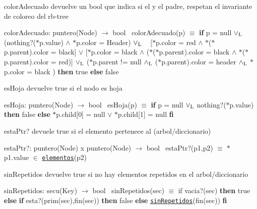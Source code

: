 \begin{DoxyParagraph}{color\+Adecuado}
devuelve un bool que indica si el y el padre, respetan el invariante de coloreo del rb-\/tree

color\+Adecuado\+: puntero(\+Node) $\to$ bool~\newline
 color\+Adecuado(p) $\equiv$ {\bfseries if} p = null $\lor_{\rm L}$ (nothing?($\ast$p.value) $\land$ $\ast$p.color = Header) $\lor_{\rm L}$ ~\newline
 \mbox{[}$\ast$p.color = red $\land$ $\ast$($\ast$p.parent).color = black\mbox{]} $\lor$ \mbox{[}$\ast$p.color = black $\land$ ($\ast$($\ast$p.parent).color = black $\land$ $\ast$($\ast$p.parent).color = red)\mbox{]} $\lor_{\rm L}$ ($\ast$p.parent != null $\land_{\rm L}$ ($\ast$p.parent).color = header $\land_{\rm L}$ $\ast$p.color = black ) {\bfseries then} true {\bfseries else} false 
\end{DoxyParagraph}


\begin{DoxyParagraph}{es\+Hoja}
devuelve true si el nodo es hoja

es\+Hoja\+: puntero(\+Node) $\to$ bool~\newline
 es\+Hoja(p) $\equiv$ {\bfseries if} p = null $\lor_{\rm L}$ nothing?($\ast$p.value) {\bfseries then} false {\bfseries else} $\ast$p.child\mbox{[}0\mbox{]} = null $\lor$ $\ast$p.child\mbox{[}1\mbox{]} = null {\bfseries fi} 
\end{DoxyParagraph}


\begin{DoxyParagraph}{esta\+Ptr?}
devuele true si el elemento pertenece al (arbol/diccionario)

esta\+Ptr?\+: puntero(\+Node) x puntero(\+Node) $\to$ bool~\newline
 esta\+Ptr?(p1,p2) $\equiv$ $\ast$p1.value $\in$ \href{axiomas.html#elementos}{\tt elementos}(p2) 
\end{DoxyParagraph}


\begin{DoxyParagraph}{sin\+Repetidos}
devuelve true si no hay elementos repetidos en el arbol/diccionario

sin\+Repetidos\+: secu(\+Key) $\to$ bool~\newline
 sin\+Repetidos(sec) $\equiv$ if vacia?(sec) {\bfseries then} true {\bfseries else} {\bfseries if} esta?(prim(sec),fin(sec)) {\bfseries then} false {\bfseries else} \href{axiomas.html#sinRepetidos}{\tt sin\+Repetidos}(fin(sec)) {\bfseries fi} 
\end{DoxyParagraph}


